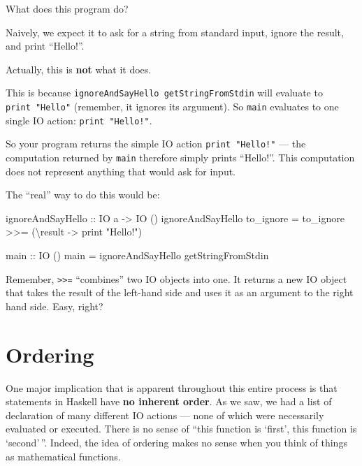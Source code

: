 \documentclass[]{article}
\newenvironment{Shaded}{}{}
\newcommand{\DataTypeTok}[1]{\textcolor[rgb]{0.56,0.13,0.00}{{#1}}}
\newcommand{\StringTok}[1]{\textcolor[rgb]{0.25,0.44,0.63}{{#1}}}
\newcommand{\OtherTok}[1]{\textcolor[rgb]{0.00,0.44,0.13}{{#1}}}
\newcommand{\FunctionTok}[1]{\textcolor[rgb]{0.02,0.16,0.49}{{#1}}}
\newcommand{\NormalTok}[1]{{#1}}
\begin{document}
What does this program do?

Naively, we expect it to ask for a string from standard input, ignore the result, and print
``Hello!''.

Actually, this is \textbf{not} what it does.

This is because \texttt{ignoreAndSayHello\ getStringFromStdin} will evaluate to
\texttt{print\ "Hello"} (remember, it ignores its argument). So \texttt{main} evaluates to one
single IO action: \texttt{print\ "Hello!"}.

So your program returns the simple IO action \texttt{print\ "Hello!"} --- the computation returned
by \texttt{main} therefore simply prints ``Hello!''. This computation does not represent anything
that would ask for input.

The ``real'' way to do this would be:

\begin{Shaded}
\begin{Highlighting}[]
\OtherTok{ignoreAndSayHello ::} \DataTypeTok{IO} \NormalTok{a }\OtherTok{->} \DataTypeTok{IO} \NormalTok{()}
\NormalTok{ignoreAndSayHello to_ignore }\FunctionTok{=} \NormalTok{to_ignore }\FunctionTok{>>=} \NormalTok{(\textbackslash{}result }\OtherTok{->} \NormalTok{print }\StringTok{"Hello!"}\NormalTok{)}

\OtherTok{main ::} \DataTypeTok{IO} \NormalTok{()}
\NormalTok{main }\FunctionTok{=} \NormalTok{ignoreAndSayHello getStringFromStdin}
\end{Highlighting}
\end{Shaded}

Remember, \texttt{\textgreater{}\textgreater{}=} ``combines'' two IO objects into one. It returns a
new IO object that takes the result of the left-hand side and uses it as an argument to the right
hand side. Easy, right?

\section{Ordering}\label{ordering}

One major implication that is apparent throughout this entire process is that statements in Haskell
have \textbf{no inherent order}. As we saw, we had a list of declaration of many different IO
actions --- none of which were necessarily evaluated or executed. There is no sense of ``this
function is `first', this function is `second'\,''. Indeed, the idea of ordering makes no sense when
you think of things as mathematical functions.
\end{document}
